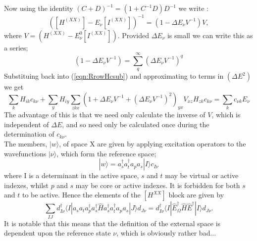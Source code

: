 \documentclass[12pt]{article}
\begin{document}
Now using the identity $(C+D)^{-1} = (1+C^{-1}D)D^{-1}$ we write : 
\begin{equation}
([H^{(XX)}]-E_{\nu}[I^{(XX)}])^{-1} =
(1-\Delta E_{\nu}V^{-1})V , 
\end{equation}
\noindent where $V = (H^{(XX)}-E^{0}_{\nu}[I^{(XX)}])$. Provided
 $\Delta E_{\nu}$ is small we can write this as a series;
\begin{equation}
(1-\Delta E_{\nu}V^{-1})= \sum_{q}^{\infty} (\Delta E_{\nu}V^{-1})^{q}
\end{equation}
Substituing back into (\ref{eqn:RrowHcsub}) and approximating to terms in $(\Delta E ^{2})$ we get
\begin{equation}
\sum_{k} H_{ik}c_{k\nu}
+\sum_{y}H_{iy}\sum_{zkx}(1+ \Delta E_{\nu}V^{-1}+ (\Delta E_{\nu}V^{-1})^{2})_{yx}V_{xz}H_{zk}c_{k\nu}
= \sum_{k}c_{\nu k}E_{\nu}
\label{eqn:RrowHc_series}
\end{equation}
The advantage of this is that we need only calculate the inverse of $V$, which is independent of $\Delta E$, and so
need only be calculated once during the determination of $c_{k \nu}$.\\

\noindent The members, $|w\rangle $, of space X are given by applying excitation operators to the wavefunctions 
$|\nu\rangle$, which form the reference space; 
\begin{equation}
|w\rangle = a_{s}^{\dagger}a_{t}^{\dagger}a_{p}a_{s}|I\rangle c_{I\nu}
\end{equation}
where I is a determinant in the active space, $s$ and $t$ may be virtual
or active indexes, whilst $p$ and $s$ may be core or active indexes. It is forbidden for
both $s$ and $t$ to be active. Hence the elements of the  $[H^{XX}]$ block are given by
\begin{equation}
\sum_{IJ}
d^{\dagger}_{I\nu}\langle I | a_{s}a_{t}a_{p}^{\dagger}a_{s}^{\dagger}
\hat{H}
a_{s}^{\dagger}a_{t}^{\dagger}a_{p}a_{s}|J\rangle d_{J\nu}
=
d^{\dagger}_{I\nu}\langle I |\hat{E}^{\dagger}_{\Omega} 
\hat{H} \hat{E}^{\dagger}|I\rangle d_{J\nu}.
\end{equation}
It is notable that this means that the definition of the external space is dependent upon the 
reference state $\nu$, which is obviously rather bad...
\end{document}
